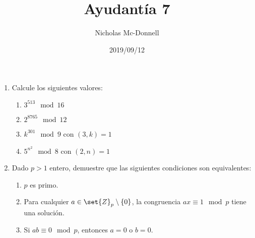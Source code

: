 \documentclass{ayudantia}
\title{Ayudantía 7}
\date{2019/09/12}
\author{Nicholas Mc-Donnell}
\begin{document}
\maketitle
\begin{enumerate}
    \item Calcule los siguientes valores:
    \begin{enumerate}[label=(\alph*)]
        \item \(3^{513}\mod 16\)
        \item \(2^{8765}\mod 12\)
        \item \(k^{301}\mod 9\) con \((3,k)=1\)
        \item \(5^{n^2}\mod 8\) con \((2,n)=1\)
    \end{enumerate}
    \item Dado \(p>1\) entero, demuestre que las siguientes condiciones son equivalentes:
    \begin{enumerate}[label=(\alph*)]
        \item \(p\) es primo.
        \item Para cualquier \(a\in\set{Z}_p\setminus\{0\}\), la congruencia \(ax\equiv 1\mod p\) tiene una solución.
        \item Si \(ab\equiv 0\mod p\), entonces \(a=0\) o \(b=0\).
    \end{enumerate}
\end{enumerate}
\end{document}
